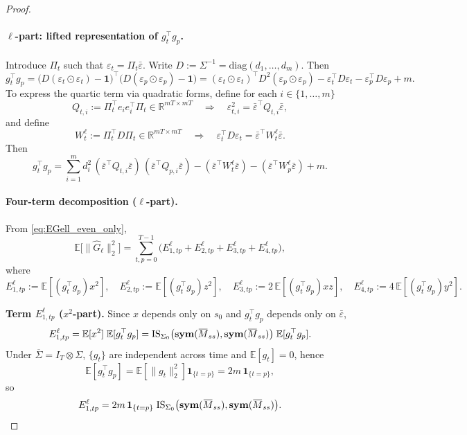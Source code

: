 \begin{proof}

\paragraph{$\ell$-part: lifted representation of $g_t^\top g_p$.}
Introduce $\Pi_t$ such that $\varepsilon_t=\Pi_t\bar\varepsilon$.
Write $D:=\Sigma^{-1}=\mathrm{diag}(d_1,\dots,d_m)$.
Then
\[
g_t^\top g_p
=\big(D(\varepsilon_t\odot\varepsilon_t)-\mathbf 1\big)^\top\big(D(\varepsilon_p\odot\varepsilon_p)-\mathbf 1\big)
=(\varepsilon_t\odot\varepsilon_t)^\top D^2(\varepsilon_p\odot\varepsilon_p)
-\varepsilon_t^\top D\varepsilon_t-\varepsilon_p^\top D\varepsilon_p+m.
\]
To express the quartic term via quadratic forms, define for each $i\in\{1,\dots,m\}$
\[
Q_{t,i}:=\Pi_t^\top e_ie_i^\top \Pi_t\in\mathbb R^{mT\times mT}
\quad\Rightarrow\quad
\varepsilon_{t,i}^2=\bar\varepsilon^\top Q_{t,i}\bar\varepsilon,
\]
and define
\[
W^\ell_t:=\Pi_t^\top D \Pi_t\in\mathbb R^{mT\times mT}
\quad\Rightarrow\quad
\varepsilon_t^\top D\varepsilon_t=\bar\varepsilon^\top W^\ell_t\bar\varepsilon.
\]
Then
\begin{equation}\label{eq:gtgp_lifted}
g_t^\top g_p
=\sum_{i=1}^m d_i^2\,
(\bar\varepsilon^\top Q_{t,i}\bar\varepsilon)\,(\bar\varepsilon^\top Q_{p,i}\bar\varepsilon)
-(\bar\varepsilon^\top W^\ell_t\bar\varepsilon)-(\bar\varepsilon^\top W^\ell_p\bar\varepsilon)+m.
\end{equation}

\paragraph{Four-term decomposition ($\ell$-part).}
From \eqref{eq:EGell_even_only},
\[
\mathbb E\big[\|\widehat G_{\ell}\|_2^2\big]
=\sum_{t,p=0}^{T-1}\big(E^{\ell}_{1,tp}+E^{\ell}_{2,tp}+E^{\ell}_{3,tp}+E^{\ell}_{4,tp}\big),
\]
where
\[
E^{\ell}_{1,tp}:=\mathbb E[(g_t^\top g_p)x^2],\quad
E^{\ell}_{2,tp}:=\mathbb E[(g_t^\top g_p)z^2],\quad
E^{\ell}_{3,tp}:=2\,\mathbb E[(g_t^\top g_p)xz],\quad
E^{\ell}_{4,tp}:=4\,\mathbb E[(g_t^\top g_p)y^2].
\]

\medskip
\noindent\textbf{Term $E^{\ell}_{1,tp}$ ($x^2$-part).}
Since $x$ depends only on $s_0$ and $g_t^\top g_p$ depends only on $\bar\varepsilon$,
\[
E^{\ell}_{1,tp}=\mathbb E[x^2]\;\mathbb E[g_t^\top g_p]
=\mathrm{IS}_{\Sigma_0} \big(\symfun(\overline M_{ss}),\symfun(\overline M_{ss})\big)\;\mathbb E[g_t^\top g_p].
\]
Under $\overline\Sigma=I_T\otimes\Sigma$, $\{g_t\}$ are independent across time and $\mathbb E[g_t]=0$, hence
\[
\mathbb E[g_t^\top g_p]=\mathbb E[\|g_t\|_2^2]\mathbf 1_{\{t=p\}}=2m\,\mathbf 1_{\{t=p\}},
\]
so
\begin{equation}\label{eq:Atp_ell_final}
E^{\ell}_{1,tp}
=2m\,\mathbf 1_{\{t=p\}}\;\mathrm{IS}_{\Sigma_0} \big(\symfun(\overline M_{ss}),\symfun(\overline M_{ss})\big).
\end{equation}


\end{proof}
